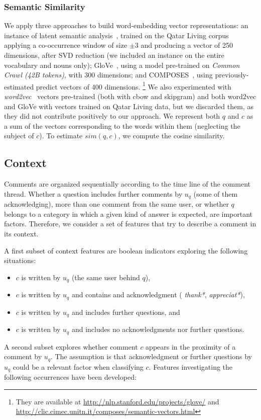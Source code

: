 \subsubsection{Semantic Similarity}
\label{sub:semantic}

We apply three approaches to build  word-embedding vector representations:
\Ni an instance of latent semantic analysis~\cite{croce-previtali:2010:GEMS}, 
trained on the Qatar Living corpus applying a co-occurrence window of size 
$\pm3$ and producing a vector of 250 dimensions, after SVD reduction (we 
included an instance on the entire vocabulary and nouns only); 
\Nii GloVe~\cite{Pennington:2014}, using a model pre-trained on \textit{Common 
Crawl (42B tokens)}, with 300 dimensions; and 
\Niii COMPOSES~\cite{Baroni:2014}, using previously-estimated predict vectors of 
400 dimensions.%
\footnote{They are available at \url{http://nlp.stanford.edu/projects/glove/} 
and \url{http://clic.cimec.unitn.it/composes/semantic-vectors.html}}
We also experimented with \textit{word2vec}~\cite{Mikolov:2013} vectors 
pre-trained (both with cbow and skipgram) and both word2vec and GloVe with 
vectors trained on Qatar Living data, but we discarded them, as they did not 
contribute positively to our approach. We represent both $q$ and $c$ as 
a sum of the vectors corresponding to the words within them (neglecting the 
subject of $c$). To estimate $sim(q,c)$, we compute the cosine similarity. 

\subsection{Context}
\label{ssub:context}

Comments are organized sequentially according to the time line of the comment 
thread. Whether a question includes further comments by $u_q$ (some of them 
acknowledging), more than one comment from the same user, or whether $q$ belongs 
to a category in which a given kind of answer is expected, are important 
factors. Therefore, we consider a set of features that try to describe a 
comment in its context.   

A first subset of context features are boolean indicators exploring the 
following situations:

\begin{itemize}\setlength\itemsep{-0.4em}
\item $c$ is written by $u_q$ (\ie the same user behind $q$),
\item \label{enu:context_ack} 
  $c$ is written by $u_q$ and contains and acknowledgment (\eg   
  \textit{thank*}, \textit{appreciat*}),
\item \label{enu:context_quest}
  $c$ is written by $u_q$ and includes further questions, and 
\item $c$ is written by $u_q$ and includes no acknowledgments nor further 
questions.
\end{itemize}
% 
A second subset explores whether comment $c$ appears in the proximity of a 
comment by $u_q$. The assumption is that acknowledgment or further 
questions by 
$u_q$ could be a relevant factor when classifying $c$. Features investigating 
the following occurrences have been developed:

